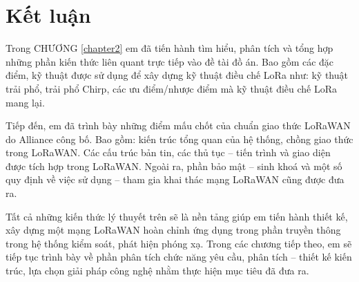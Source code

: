 	\section{Kết luận}
	Trong     CHƯƠNG \ref{chapter2} em đã tiến hành tìm hiểu, phân tích và tổng hợp những phần kiến thức liên quant trực tiếp vào đề tài đồ án. Bao gồm các đặc điểm, kỹ thuật được sử dụng để xây dựng kỹ thuật điều chế LoRa như: kỹ thuật trải phổ, trải phổ Chirp, các ưu điểm/nhược điểm mà kỹ thuật điều chế LoRa mang lại.\par
Tiếp đến, em đã trình bày những điểm mấu chốt của chuẩn giao thức LoRaWAN do Alliance công bố. Bao gồm: kiến trúc tổng quan của hệ thống, chồng giao thức trong LoRaWAN. Các cấu trúc bản tin, các thủ tục – tiến trình và giao diện được tích hợp trong LoRaWAN. Ngoài ra, phần bảo mật – sinh khoá và một số quy định về việc sử dụng – tham gia khai thác mạng LoRaWAN cũng được đưa ra. \par
Tất cả những kiến thức lý thuyết trên sẽ là nền tảng giúp em tiến hành thiết kế, xây dựng một mạng LoRaWAN hoàn chỉnh ứng dụng trong phần truyền thông trong hệ thống kiểm soát, phát hiện phóng xạ. Trong các chương tiếp theo, em sẽ tiếp tục trình bày về phần phân tích chức năng yêu cầu, phân tích – thiết kế kiến trúc, lựa chọn giải pháp công nghệ nhằm thực hiện mục tiêu đã đưa ra.

